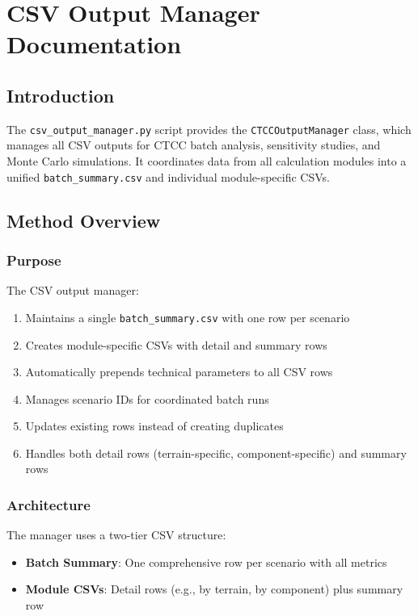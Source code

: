 \documentclass[ctcc_full_documentation.tex]{subfiles}
\begin{document}
\chapter{CSV Output Manager Documentation}

\section{Introduction}

The \texttt{csv\_output\_manager.py} script provides the \texttt{CTCCOutputManager} class, which manages all CSV outputs for CTCC batch analysis, sensitivity studies, and Monte Carlo simulations. It coordinates data from all calculation modules into a unified \texttt{batch\_summary.csv} and individual module-specific CSVs.

\section{Method Overview}

\subsection{Purpose}

The CSV output manager:
\begin{enumerate}
    \item Maintains a single \texttt{batch\_summary.csv} with one row per scenario
    \item Creates module-specific CSVs with detail and summary rows
    \item Automatically prepends technical parameters to all CSV rows
    \item Manages scenario IDs for coordinated batch runs
    \item Updates existing rows instead of creating duplicates
    \item Handles both detail rows (terrain-specific, component-specific) and summary rows
\end{enumerate}

\subsection{Architecture}

The manager uses a two-tier CSV structure:
\begin{itemize}
    \item \textbf{Batch Summary}: One comprehensive row per scenario with all metrics
    \item \textbf{Module CSVs}: Detail rows (e.g., by terrain, by component) plus summary row
\end{itemize}
\end{document}
